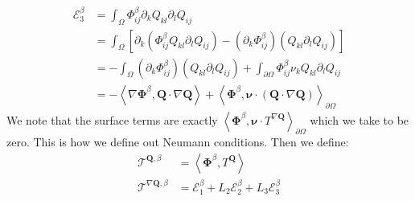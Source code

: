 \documentclass[reqno]{article}
\newcommand{\Q}{\mathbf{Q}}
\begin{document}
\begin{equation}
\begin{split}
    \mathcal E^\beta_3
    &=
    \int_\Omega \Phi^\beta_{ij} \partial_k Q_{kl} \partial_l Q_{ij} \\
    &=
    \int_\Omega \left[
        \partial_k \left( \Phi^\beta_{ij} Q_{kl} \partial_l Q_{ij} \right)
        - \left( \partial_k \Phi^\beta_{ij} \right) \left( Q_{kl} \partial_l Q_{ij} \right)
    \right] \\
    &=
    -\int_\Omega\left( \partial_k \Phi^\beta_{ij} \right) \left( Q_{kl} \partial_l Q_{ij} \right)
    + \int_{\partial \Omega} \Phi^\beta_{ij} \nu_k Q_{kl} \partial_l Q_{ij} \\
    &=
    - \left< \nabla \boldsymbol \Phi^\beta, \Q \cdot \nabla \Q \right>
    + \left< \boldsymbol \Phi^\beta, \boldsymbol \nu \cdot \left( \Q \cdot \nabla \Q \right)\right>_{\partial \Omega}
\end{split}
\end{equation}
We note that the surface terms are exactly $\left< \boldsymbol \Phi^\beta, \boldsymbol \nu \cdot T^{\nabla \Q}\right>_{\partial \Omega}$ which we take to be zero.
This is how we define out Neumann conditions.
Then we define:
\begin{align}
    \mathcal T^{\Q, \beta}
    &=
    \left< \boldsymbol \Phi^\beta, T^\Q \right> \\
    \mathcal T^{\nabla \Q, \beta}
    &=
    \mathcal E^\beta_1
    + 
    L_2 \mathcal E^\beta_2
    +
    L_3 \mathcal E^\beta_3
\end{align}
\end{document}
